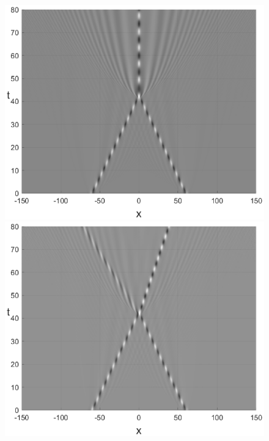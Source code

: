\documentclass[preprint,12pt]{elsarticle}
\begin{document}
\begin{figure}[H]
\begin{minipage}[h]{0.32\linewidth}
\includegraphics[width=1\linewidth]{fig54g.eps}
\end{minipage}
\begin{minipage}[h]{0.32\linewidth}
\includegraphics[width=1\linewidth]{fig57g.eps}
\end{minipage}

\end{figure}
\end{document}
